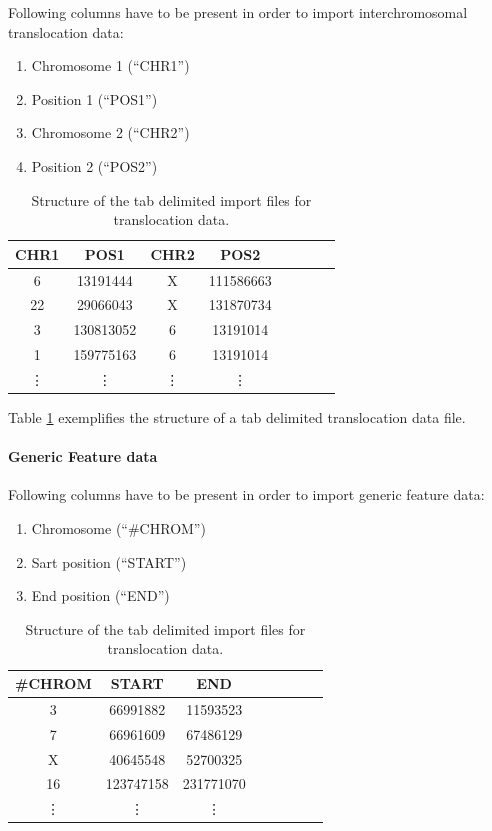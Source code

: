 \documentclass[11pt,final]{article}
\begin{document}
Following columns have to be present in order to import interchromosomal
translocation data:

\begin{enumerate}
  \item Chromosome 1 (``CHR1'')
  \item Position 1 (``POS1'')
  \item Chromosome 2 (``CHR2'')
  \item Position 2 (``POS2'')
\end{enumerate}

\begin{table}
	\centering
	\begin{tabular}[h]{|c|c|c|c|c|c|c|c|}
	  \hline
	  CHR1 & POS1 & CHR2 & POS2 \\ \hline
	 6 & 13191444 & X & 111586663 \\
         22 & 29066043 & X & 131870734 \\
         3 & 130813052 & 6 & 13191014 \\
         1 & 159775163 & 6 & 13191014 \\
	 \vdots & \vdots & \vdots & \vdots \\
	\end{tabular}
	\caption{Structure of the tab delimited import files for translocation
	data.}
	\label{tab:tsv_transloc}
\end{table}

Table \ref{tab:tsv_transloc} exemplifies the structure of a tab delimited
translocation data file.

\paragraph{Generic Feature data}

Following columns have to be present in order to import generic feature data:

\begin{enumerate}
  \item Chromosome (``\#CHROM'')
  \item Sart position (``START'')
  \item End position (``END'')
\end{enumerate}

\begin{table}
	\centering
	\begin{tabular}[h]{|c|c|c|c|c|c|c|c|}
	  \hline
	  \#CHROM & START & END \\ \hline
	 3 & 66991882 & 11593523 \\
         7 & 66961609 & 67486129 \\
         X & 40645548 & 52700325 \\
         16 & 123747158 & 231771070 \\
	 \vdots & \vdots & \vdots \\
	\end{tabular}
	\caption{Structure of the tab delimited import files for translocation
	data.}
	\label{tab:tsv_gen}
\end{table}
\end{document}
